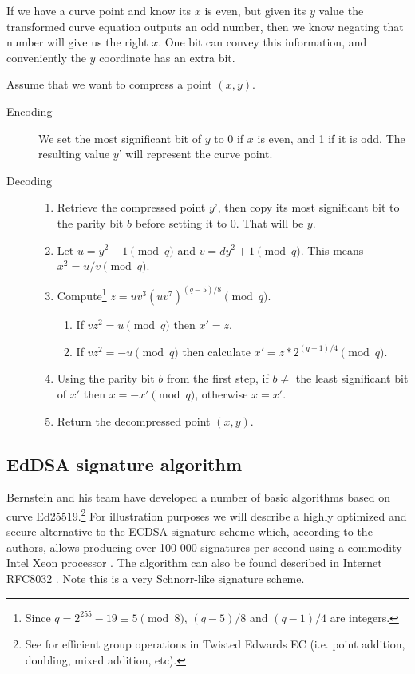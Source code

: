 If we have a curve point and know its $x$ is even, but given its $y$ value the transformed curve equation outputs an odd number, then we know negating that number will give us the right $x$. One bit can convey this information, and conveniently the $y$ coordinate has an extra bit.

Assume that we want to compress a point \((x, y)\).

\begin{description}
	\item[Encoding] We set the most significant bit of $y$ to 0 if $x$ is even, and 1 if it is odd. The resulting value $y’$ will represent the curve point.
	
	\item[Decoding] \hfill
	    \begin{enumerate}
    	    \item Retrieve the compressed point $y’$, then copy its most significant bit to the parity bit $b$ before setting it to 0. That will be $y$.
    	    \item Let \(u = y^2-1 \pmod q\) and \(v = d y^2  + 1 \pmod q\). This means $x^2 = u/v \pmod q$.
    	    \item Compute\footnote{Since $q = 2^{255}-19 \equiv 5 \pmod{8}$, $(q-5)/8$ and $(q-1)/4$ are integers.} \(z = u v^3 (u v^7)^{(q-5)/8} \pmod q\).
            \begin{enumerate}
                \item If \(v z^2 = u \pmod q\) then \(x' = z\).
                \item If \(v z^2 = -u \pmod q\) then calculate \(x' = z*2^{(q-1)/4} \pmod q\).
            \end{enumerate}
            \item Using the parity bit \(b\) from the first step, if $b \ne$ the least significant bit of $x'$ then  \(x = -x' \pmod q\), otherwise \(x = x'\).
            \item Return the decompressed point $(x,y)$.
	    \end{enumerate}
\end{description}


\subsection{EdDSA signature algorithm}
\label{EdDSA_section}

Bernstein and his team have developed a number of basic algorithms based on curve Ed25519.\footnote{\label{group_ops_twisted_edwards_note}See \cite{Bernstein2007} for efficient group operations in Twisted Edwards EC (i.e. point addition, doubling, mixed addition, etc).}
For illustration purposes we will describe a highly optimized and secure alternative to the ECDSA signature scheme which, according to the authors, allows producing over 100 000 signatures per second using a commodity Intel Xeon processor \cite{Bernstein2012}. The algorithm can also be found described in Internet RFC8032 \cite{rfc8032}. Note this is a very Schnorr-like signature scheme.

